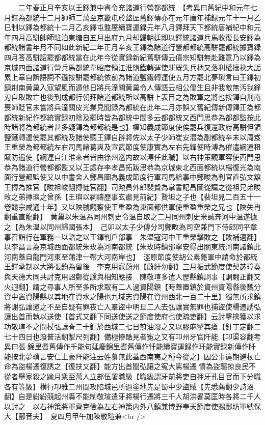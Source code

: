 　　二年春正月辛亥以王鐸兼中書令充諸道行營都都統　【考異曰舊紀中和元年七月鐸為都統十二月帥師二萬至京畿屯於盩厔舊鐸傳亦在元年唐年補録元年十一月乙巳制以鐸為都統十二月乙亥鐸屯盩厔續寶運録元年八月鐸拜天下都統唐補紀中和元年四月高駢帥師駐泊東塘自五月出府九月却歸朝廷即以鐸統諸道兵馬收復長安鐸為都統諸書年月不同如此新紀二年正月辛亥王鐸為諸道行營都都統高駢罷都統據寶録四月答高駢詔罷都都統當在此年今從實録新紀舊駢傳云僖宗知駢無赴難意乃以鐸為京城四面諸道行營兵馬都統韋昭度領江淮鹽鐵轉運使駢既失兵柄又落利權攘袂大詬累上章自訴語詞不遜按駢罷都統依前為諸道鹽鐵轉運使五月方罷北夢瑣言曰王鐸初鎮荆南黄巢入寇望風而遁他日將兵潼關黄巢令人傳語云相公儒生且非我敵無汚我鋒刃自取敗亡也後到成都行朝拜諸道都統所以高駢上表目之為敗軍之將也按鐸自荆南喪師貶官未嘗將兵潼關皮光業見聞録為都統在此年二月亦誤又舊紀傳新傳鐸正為都都統新紀作都統實録初除及罷時皆為都統中間多云都都統又西門思恭為都都監按此時諸將為都統者甚多疑鐸為都都統是也】權知義成節度使俟罷兵復還政府高駢但領鹽鐵轉運使罷其都統及諸使聽王鐸自辟將佐以太子少師崔安潜為副都統辛未以周岌王重榮為都都統左右司馬諸葛爽及宣武節度使康實為左右先鋒使時溥為催遣綱運租賦防遏使【綱運自江淮來者皆由徐州巡内故以溥任此職】以右神策觀軍容使西門思恭為諸道行營都都監又以王處存李孝昌拓跋思恭為京城東北西面都統以楊復光為南面行營都監使又以中書舍人鄭昌圖為義成節度行軍司馬給事中鄭畯為判官直弘文舘王摶為推官【畯祖峻翻摶徒官翻】司勲員外郎裴贄為掌書記昌圖從讜之從祖兄弟畯畋之弟摶璵之曾孫【王璵以祠禱歷事玄肅見前紀】贄坦之子也【裴坦見二百五十一卷懿宗咸通十年】又以陜虢觀察使王重盈為東面都供軍使重盈重榮之兄也【陜失冉翻重直龍翻】　黄巢以朱温為同州刺史令温自取之二月同州刺史米誠奔河中温遂據之【為朱温以同州歸國張本】　己卯以太子少傅分司鄭畋為司空兼門下侍郎同平章事召詣行在軍務一以諮之以王鐸判戶部事　朱温寇河中王重榮擊敗之【敗補邁翻】以李昌言為京城西面都統朱玫為河南都統【朱玫時鎮邠寧安得出關東統河南諸鎮此河南蓋自龍門河東至蒲津一帶大河南岸也】　涇原節度使胡公素薨軍中請命於都統王鐸承制以大將張鈞為留後　李克用寇蔚州【蔚紆勿翻】三月振武節度使契苾璋奏與天德大同共討克用詔鄭從讜與相知應接　陳敬瑄多遣人歷縣鎮詗事【詗翾正翻又火迥翻】謂之尋事人所至多所求取有二人過資陽鎮【時蓋置鎮於資州資陽縣後魏分資中置資陽縣以其地在資水之陽也九域志資陽在資州西北一百二十里】獨無所求鎮將謝弘讓邀之不至自疑有罪夜亡入羣盜中明旦二人去弘讓實無罪也捕盜使楊遷誘弘讓出首而執以送使【首式又翻下同送使送之節度使府也使疏吏翻】云討擊擒獲以求功敬瑄不之問杖弘讓脊二十釘於西城二七日煎油潑之又以膠麻掣其瘡【釘丁定翻二七十四日也潑普活翻掣尺列翻】備極慘酷見者寃之又有卭州牙官阡能【卭渠容翻考異曰張錦里耆舊傳作千能句延慶錦里耆舊傳作忏能續寶運録作玕能實録新傳作阡能按北夢瑣言安仁土豪阡能注云姓繤無此蓋西南夷之種今從之】因公事違期避杖亡命為盜楊遷復誘之【復扶又翻】能方出首聞弘讓之寃大罵楊遷憤為盜驅掠良民不從者舉家殺之踰月衆至萬人立部伍署職級【職級謂牙前將吏自押牙孔目官而下分職各有等級】横行卭雅二州間攻陷城邑所過塗地先是蜀中少盜賊【先悉薦翻少詩沼翻】自是紛紛競起州縣不能制敬瑄遣牙將楊行遷將三千人胡洪畧莫匡時各將二千人以討之　以右神策將軍齊克儉為左右神策内外八鎮兼博野奉天節度使賜鄜坊軍號保大【鄜音夫】　夏四月甲午加陳敬瑄兼<br />
